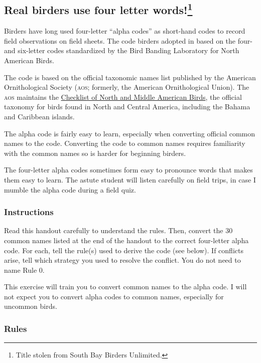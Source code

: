 \documentclass[11pt]{article}
\begin{document}
\thispagestyle{plain}

\subsection*{Real birders use four letter words!\footnote{Title stolen from South Bay Birders Unlimited.}}

Birders have long used four-letter “alpha codes” as short-hand codes to record field observations on field sheets. The code birders adopted in based on the four- and six-letter codes standardized by the Bird Banding Laboratory for North American Birds. 

The code is based on the official taxonomic names list published by the American Ornithological Society (\textsc{aos;} formerly, the American Ornithological Union). The \textsc{aos} maintains the \href{http://checklist.americanornithology.org/}{Checklist of North and Middle American Birds}, the official taxonomy for birds found in North and Central America, including the Bahama and Caribbean islands.

The alpha code is fairly easy to learn, especially when converting official common names to the code. Converting the code to common names requires familiarity with the common names so is harder for beginning birders. 

The four-letter alpha codes sometimes form easy to pronounce words that makes them easy to learn. The astute student will listen carefully on field trips, in case I mumble the alpha code during a field quiz.  

\subsubsection*{Instructions}

Read this handout carefully to understand the rules. Then, convert the 30 common names listed at the end of the handout to the correct four-letter alpha code. For each, tell the rule(s) used to derive the code (see below). If conflicts arise, tell which  strategy you used to resolve the conflict. You do not need to name Rule 0.

This exercise will train you to convert common names to the alpha code. I will not expect you to convert alpha codes to common names, especially for uncommon birds.

\subsubsection*{Rules}
\end{document}
